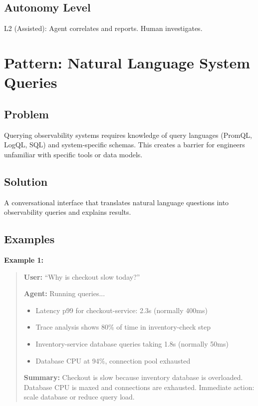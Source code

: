 \subsection{Autonomy Level}

L2 (Assisted): Agent correlates and reports. Human investigates.

\section{Pattern: Natural Language System Queries}
\label{sec:nl-queries}

\subsection{Problem}

Querying observability systems requires knowledge of query languages (PromQL, LogQL, SQL) and system-specific schemas. This creates a barrier for engineers unfamiliar with specific tools or data models.

\subsection{Solution}

A conversational interface that translates natural language questions into observability queries and explains results.

\subsection{Examples}

\textbf{Example 1:}
\begin{quote}
\textbf{User:} ``Why is checkout slow today?''

\textbf{Agent:} Running queries...
\begin{itemize}
    \item Latency p99 for checkout-service: 2.3s (normally 400ms)
    \item Trace analysis shows 80\% of time in inventory-check step
    \item Inventory-service database queries taking 1.8s (normally 50ms)
    \item Database CPU at 94\%, connection pool exhausted
\end{itemize}

\textbf{Summary:} Checkout is slow because inventory database is overloaded. Database CPU is maxed and connections are exhausted. Immediate action: scale database or reduce query load.
\end{quote}

